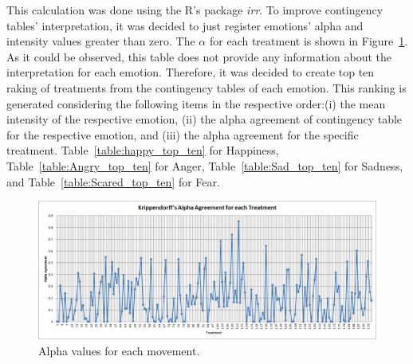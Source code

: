 This calculation was done using the R's package \textit{irr}. To improve contingency tables' interpretation, it was decided to just register emotions' alpha and intensity values greater than zero. The $\alpha$ for each treatment is shown in Figure~\ref{fig:alpha_experience}. As it could be observed, this table does not provide any information about the interpretation for each emotion. Therefore, it was decided to create top ten raking of treatments from the contingency tables of each emotion. This ranking is generated considering the following items in the respective order:(i) the mean intensity of the respective emotion, (ii) the alpha agreement of contingency table for the respective emotion, and (iii) the alpha agreement for the specific treatment. Table~\ref{table:happy_top_ten} for Happiness, Table~\ref{table:Angry_top_ten} for Anger, Table~\ref{table:Sad_top_ten} for Sadness, and Table~\ref{table:Scared_top_ten} for Fear.

\begin{figure}
	\centering
	\includegraphics[width=1.0\textwidth]{./Images/Alpha.png} 
	\caption{Alpha values for each movement.}
	\label{fig:alpha_experience}
\end{figure}

